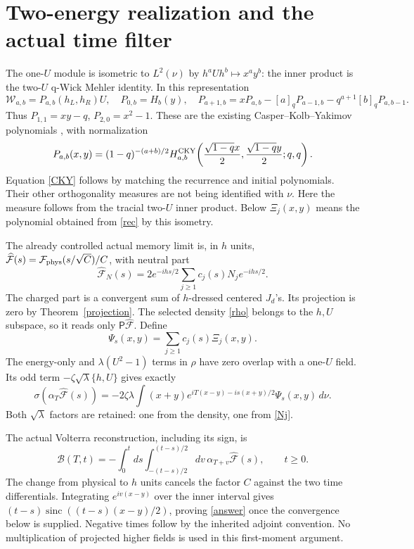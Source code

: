 \documentclass[11pt]{article}
\newcommand{\PP}{\mathsf P}
\newcommand{\WW}{\mathcal W}
\newcommand{\sinc}{\operatorname{sinc}}
\begin{document}
\newpage
\section{Two-energy realization and the actual time filter}
The one-$U$ module is isometric to $L^2(\nu)$ by
$h^aUh^b\mapsto x^ay^b$: the inner product is the two-$U$
q-Wick Mehler identity. In this representation
\[
 \WW_{a,b}=P_{a,b}(h_L,h_R)U,\quad P_{0,b}=H_b(y),\quad
 P_{a+1,b}=xP_{a,b}-[a]_qP_{a-1,b}-q^{a+1}[b]_qP_{a,b-1}.
\]
Thus $P_{1,1}=xy-q$, $P_{2,0}=x^2-1$. These are the existing
Casper--Kolb--Yakimov polynomials \cite{CKY}, with normalization
\begin{equation}\label{CKY}
 P_{a,b}(x,y)=(1-q)^{-(a+b)/2}
 H_{a,b}^{\rm CKY}\!\left(\frac{\sqrt{1-q}x}{2},
                         \frac{\sqrt{1-q}y}{2};q,q\right).
\end{equation}
Equation \eqref{CKY} follows by matching the recurrence and
initial polynomials. Their other orthogonality measures are not
being identified with $\nu$. Here the measure follows from the
tracial two-$U$ inner product. Below $\Xi_j(x,y)$ means the
polynomial obtained from \eqref{rec} by this isometry.

The already controlled actual memory limit \cite{sector} is,
in $h$ units, $\widehat{\mathcal F}(s)=\mathcal F_{\rm phys}
(s/\sqrt C)/C$, with neutral part
\[
 \widehat{\mathcal F}_N(s)=
 2e^{-ihs/2}\sum_{j\ge1}c_j(s)N_j e^{-ihs/2}.
\]
The charged part is a convergent sum of $h$-dressed centered
$J_d$'s. Its projection is zero by Theorem~\ref{projection}.
The selected density \eqref{rho} belongs to the $h,U$ subspace,
so it reads only $\PP\widehat{\mathcal F}$. Define
\[
 \Psi_s(x,y)=\sum_{j\ge1}c_j(s)\Xi_j(x,y).
\]
The energy-only and $\lambda(U^2-1)$ terms in $\rho$ have zero
overlap with a one-$U$ field. Its odd term
$-\zeta\sqrt\lambda\{h,U\}$ gives exactly
\begin{equation}\label{force}
 \sigma(\alpha_T\widehat{\mathcal F}(s))=
 -2\zeta\lambda\int(x+y)e^{iT(x-y)-is(x+y)/2}
                     \Psi_s(x,y)\,d\nu.
\end{equation}
Both $\sqrt\lambda$ factors are retained: one from the density,
one from \eqref{Nj}.

The actual Volterra reconstruction, including its sign, is
\begin{equation}\label{filter}
 \mathcal B(T,t)=-\int_0^t ds
       \int_{-(t-s)/2}^{(t-s)/2}dv\,
           \alpha_{T+v}\widehat{\mathcal F}(s),\qquad t\ge0.
\end{equation}
The change from physical to $h$ units cancels the factor $C$
against the two time differentials. Integrating
$e^{iv(x-y)}$ over the inner interval gives
$(t-s)\sinc((t-s)(x-y)/2)$, proving \eqref{answer} once the
convergence below is supplied. Negative times follow by the
inherited adjoint convention. No multiplication of projected
higher fields is used in this first-moment argument.
\end{document}
